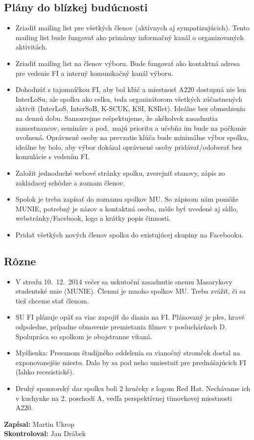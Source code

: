 \documentclass[11pt,a4paper]{article}
\begin{document}
\subsection*{Plány do blízkej budúcnosti}
\begin{itemize}[itemsep=0pt]
\item Zriadiť mailing list pre všetkých členov (aktívnych aj sympatizujúcich). Tento mailing list bude fungovať ako primárny informačný kanál o organizovaných aktivitách.
\item Zriadiť mailing list na členov výboru. Bude fungovať ako kontaktná adresa pre vedenie FI a interný komunikačný kanál výboru.
\item Dohodnúť s tajomníčkou FI, aby bol kľúč a miestnosť A220 dostupná nie len InterLoSu, ale spolku ako celku, teda organizátorom všetkých zúčastnených aktivít (InterLoS, InterSoB, K-SCUK, KSI, KSIlet). Ideálne bez obmedzenia na dennú dobu. Samozrejme rešpektujeme, že akékolvek zasadnutia zamestnancov, semináre a pod.\ majú prioritu a učebňa im bude na počkanie uvoľnená. Oprávnené osoby na prevzatie kľúča bude minimálne výbor spolku, ideálne by bolo, aby výbor dokázal oprávnené osoby pridávať/odoberať bez konzulácie s vedením FI.
\item Založit jednoduché webové stránky spolku, zverejniť stanovy, zápis zo zakladacej schôdze a zoznam členov.
\item Spolok je treba zapísať do zoznamu spolkov MU. So zápisom nám pomôže MUNIE, potrebný je názov a kontaktná osoba, môže byť uvedené aj sídlo, webstránky/Facebook, logo a krátky popis činnosti.
\item Pridať všetkých nových členov spolku do existujúcej skupiny na Facebooku.
\end{itemize}

\subsection*{Rôzne}
\begin{itemize}[itemsep=0pt]
\item V stredu 10.\ 12.\ 2014 večer sa uskutoční zasadnutie snemu Masarykovy studentské unie (MUNIE). Členmi je mnoho spolkov MU. Treba zvážiť, či sa tiež chceme stať členom.
\item SU FI plánuje opäť sa viac zapojiť do diania na FI. Plánovaný je ples, hravé odpoledne, prípadne obnovenie premietania filmov v posluchárňach D. Spolupráca so spolkom je obojstranne vítaná.
\item Myšlienka: Presunom študijného oddelenia sa vianočný stromček dostal na exponovanejšie miesto. Dalo by sa pod neho umiestniť  pre prednášajúcich FI (ľahko recesistické).
\item Druhý sponzorský dar spolku boli 2 hrnčeky s logom Red Hat. Nechávame ich v kuchynke na 2. poschodí A, vedľa perspektívnej tímovkovej miestnosti A220.
\end{itemize}
\textbf{Zapísal:} Martin Ukrop\\
\textbf{Skontroloval:} Jan Drábek
\end{document}
